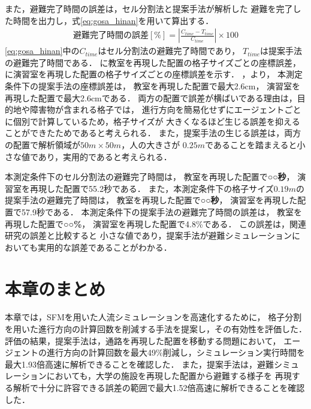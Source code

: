 また，避難完了時間の誤差は，セル分割法と提案手法が解析した
避難を完了した時間を出力し，式\eqref{eq:gosa_hinan}を用いて算出する．
%
\begin{eqnarray}
\label{eq:gosa_hinan}
\mbox{避難完了時間の誤差$[\%]$} = \left | \frac{C_{time} - T_{time}}{C_{time}} \right | \times 100
\end{eqnarray}
%
\eqref{eq:gosa_hinan}中の$C_{time}$はセル分割法の避難完了時間であり，
$T_{time}$は提案手法の避難完了時間である．
\fi
%
%
に教室を再現した配置の格子サイズごとの座標誤差，
に演習室を再現した配置の格子サイズごとの座標誤差を示す．
，より，
本測定条件下の提案手法の座標誤差は，
教室を再現した配置で最大2.6cm，
演習室を再現した配置で最大2.6cmである．
両方の配置で誤差が横ばいである理由は，目的地や障害物が含まれる格子では，
進行方向を簡易化せずにエージェントごとに個別で計算しているため，格子サイズが
大きくなるほど生じる誤差を抑えることができたためであると考えられる．
また，提案手法の生じる誤差は，両方の配置で解析領域が$50m\times50m$，人の大きさが
$0.25m$であることを踏まえると小さな値であり，実用的であると考えられる．

本測定条件下のセル分割法の避難完了時間は，
教室を再現した配置で\textbf{○○秒}，
演習室を再現した配置で55.2秒である．
また，本測定条件下の格子サイズ$0.19m$の提案手法の避難完了時間は，
教室を再現した配置で\textbf{○○秒}，
演習室を再現した配置で57.9秒である．
本測定条件下の提案手法の避難完了時間の誤差は，
教室を再現した配置で\textbf{○○\%}，
演習室を再現した配置で4.8\%である．
この誤差は，関連研究\cite{1jigen_model}の誤差と比較すると
小さな値であり，提案手法が避難シミュレーションにおいても実用的な誤差であることがわかる．
\fi

\clearpage
\section{本章のまとめ}
本章では，SFMを用いた人流シミュレーションを高速化するために，
格子分割を用いた進行方向の計算回数を削減する手法を提案し，その有効性を評価した．
評価の結果，提案手法は，通路を再現した配置を移動する問題において，
エージェントの進行方向の計算回数を最大49\%削減し，シミュレーション実行時間を
最大1.93倍高速に解析できることを確認した．
また，提案手法は，避難シミュレーションにおいても，大学の施設を再現した配置から避難する様子を
再現する解析で十分に許容できる誤差の範囲で最大1.52倍高速に解析できることを確認した．

